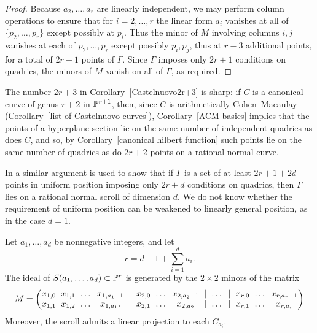 \begin{proof}
Because $a_2,\dots, a_r$ are linearly independent,
we may perform column operations to ensure that for $i=2, \dots, r$
the linear form
$a_i$ vanishes at all of $\{p_2,\dots, p_{r}\}$ except possibly at $p_i$.
Thus the minor of $M$ involving columns $i,j$ vanishes at each of
$p_2,\dots, p_r$ except possibly
$p_i,p_j$, thus at 
$r-3$ additional 
points, for a total of $2r+1$ points
of $\Gamma$. Since
$\Gamma$ imposes only $2r+1$ conditions on quadrics, the minors of $M$
vanish on all of $\Gamma$,
as required.
\end{proof}

The number $2r+3$ in Corollary~\ref{Castelnuovo2r+3} is sharp: if $C$
is a canonical curve of genus $r+2$ in ${\mathbb P}^{r+1}$, then, since $C$
is arithmetically Cohen--Macaulay (Corollary~\ref{list of Castelnuovo curves}),
Corollary~\ref{ACM basics} implies that the points of a hyperplane
section lie on the same number of independent quadrics as does $C$,
and so,
by Corollary~\ref{canonical hilbert function} such points lie on the
same number of
quadrics as do $2r+2$ points on a rational normal curve.

\begin{fact}
In \cite{MR685427} a similar argument is used to show that if $\Gamma$
is a set of 
at least
$2r+1+2d$ points in uniform position
imposing only
$2r+d$ conditions on quadrics, then $\Gamma$ lies on a rational normal
scroll of dimension $d$.
We do not know whether the requirement of 
%
uniform position can be weakened
to linearly general position,
as in the case $d=1$.
\end{fact}

\begin{corollary}\label{equations of scrolls} Let $a_{1}, \dots, a_{d}$
be nonnegative integers, and let
$$r = d-1+\sum_{i=1}^{d} a_{i}.$$
The ideal of $S(a_{1},\dots,a_{d})\subset {\mathbb P}^{r}$ is generated by the
%
$2\times 2$ minors of the matrix
$$
\setcounter{MaxMatrixCols}{20}
\arraycolsep=3pt
M = \begin{pmatrix}
x_{1,0}&x_{1,1}&\dots&x_{1, a_{1}-1}&|&x_{2,0}&\dots&x_{2,
a_{2}-1}&|&\dots&|&x_{r,0}&\dots&x_{r, a_{r}-1}\\
x_{1,1}&x_{1,2}&\dots&x_{1, a_{1}}.  &|&x_{2,1}&\dots&x_{2,
a_{2}}&|&\dots&|&x_{r,1}&\dots&x_{r, a_{r}}
\end{pmatrix}
$$
Moreover, the scroll admits a linear projection to each $C_{a_i}$.
\unif
\end{corollary}

